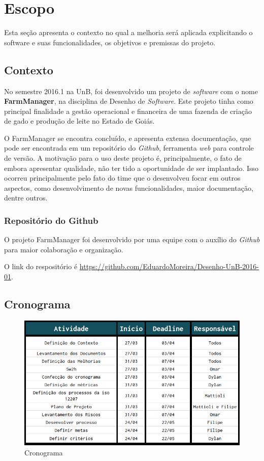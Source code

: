 \chapter[Escopo]{Escopo}

Esta seção apresenta o contexto no qual a melhoria será aplicada explicitando o software e suas funcionalidades, os objetivos e premissas do projeto.

\section{Contexto}

No semestre 2016.1 na UnB, foi desenvolvido um projeto de \textit{software} com o nome \textbf{FarmManager}, na disciplina de Desenho de \textit{Software}. Este projeto tinha como principal finalidade a gestão operacional e financeira de uma fazenda de criação de gado e produção de leite no Estado de Goiás.

O FarmManager se encontra concluído, e apresenta extensa documentação, que pode ser encontrada em um repositório do \textit{Github}, ferramenta \textit{web} para controle de versão. A motivação para o uso deste projeto é, principalmente, o fato de embora apresentar qualidade, não ter tido a oportunidade de ser implantado. Isso ocorreu principalmente pelo fato do time que o desenvolveu focar em outros aspectos, como desenvolvimento de novas funcionalidades, maior documentação, dentre outros.

\subsection{Repositório do Github}

O projeto FarmManager foi desenvolvido por uma equipe com o auxílio do \textit{Github} para maior colaboração e organização.

O link do respositório é \url{https://github.com/EduardoMoreira/Desenho-UnB-2016-01}.



\section{Cronograma}

\begin{figure}[h!]
	\includegraphics[keepaspectratio=true,scale= 0.65]{figuras/cronograma-mps.png}
	\caption{Cronograma}
	\label{eap}
\end{figure}

